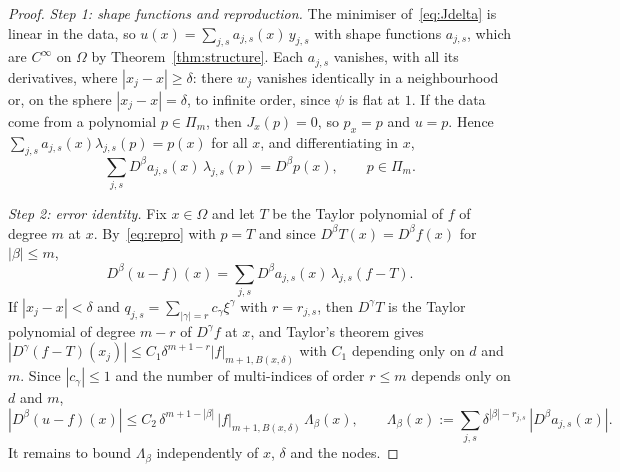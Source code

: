 \documentclass[12pt]{amsart}
\theoremstyle{definition}
\theoremstyle{remark}
\newcommand{\Pm}{\Pi_m}
\begin{document}
\begin{proof}
\emph{Step 1: shape functions and reproduction.} The minimiser of~\eqref{eq:Jdelta} is linear in
the data, so $u(x)=\sum_{j,s}a_{j,s}(x)\,y_{j,s}$ with shape functions $a_{j,s}$, which are
$C^\infty$ on $\Omega$ by Theorem~\ref{thm:structure}. Each $a_{j,s}$ vanishes, with all its
derivatives, where $|x_j-x|\ge\delta$: there $w_j$ vanishes identically in a neighbourhood or,
on the sphere $|x_j-x|=\delta$, to infinite order, since $\psi$ is flat at $1$. If the
data come from a polynomial $p\in\Pm$, then $J_x(p)=0$, so $p_x=p$ and $u=p$. Hence
$\sum_{j,s}a_{j,s}(x)\lambda_{j,s}(p)=p(x)$ for all $x$, and differentiating in $x$,
\begin{equation}\label{eq:repro}
  \sum_{j,s}D^\beta a_{j,s}(x)\,\lambda_{j,s}(p)=D^\beta p(x),\qquad p\in\Pm .
\end{equation}

\emph{Step 2: error identity.} Fix $x\in\Omega$ and let $T$ be the Taylor polynomial of $f$ of
degree $m$ at $x$. By~\eqref{eq:repro} with $p=T$ and since $D^\beta T(x)=D^\beta f(x)$ for
$|\beta|\le m$,
\[
  D^\beta(u-f)(x)=\sum_{j,s}D^\beta a_{j,s}(x)\,\lambda_{j,s}(f-T).
\]
If $|x_j-x|<\delta$ and $q_{j,s}=\sum_{|\gamma|=r}c_\gamma\xi^\gamma$ with $r=r_{j,s}$, then
$D^\gamma T$ is the Taylor polynomial of degree $m-r$ of $D^\gamma f$ at $x$, and Taylor's
theorem gives $|D^\gamma(f-T)(x_j)|\le C_1\delta^{m+1-r}|f|_{m+1,B(x,\delta)}$ with $C_1$
depending only on $d$ and $m$. Since $|c_\gamma|\le1$ and the number of multi-indices of order
$r\le m$ depends only on $d$ and $m$,
\begin{equation}\label{eq:lebesgue}
  |D^\beta(u-f)(x)|\le C_2\,\delta^{m+1-|\beta|}\,|f|_{m+1,B(x,\delta)}\,\Lambda_\beta(x),
  \qquad
  \Lambda_\beta(x):=\sum_{j,s}\delta^{|\beta|-r_{j,s}}\,|D^\beta a_{j,s}(x)| .
\end{equation}
It remains to bound $\Lambda_\beta$ independently of $x$, $\delta$ and the nodes.


\end{proof}
\end{document}
